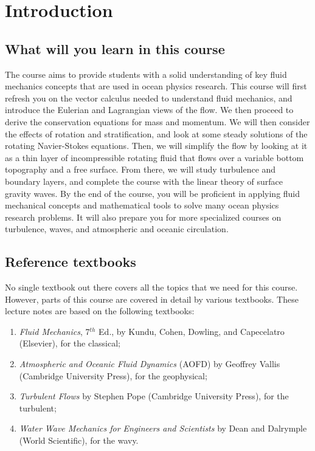 \documentclass[12pt]{article}
\numberwithin{equation}{section}
\numberwithin{figure}{section}
\numberwithin{table}{section}
\begin{document}
\newpage
\section{Introduction}

\subsection{What will you learn in this course}

The course aims to provide students with a solid understanding of key fluid
mechanics concepts that are used in ocean physics research.
This course will first refresh you on the vector calculus needed to understand
fluid mechanics, and introduce the Eulerian and Lagrangian views of the flow.
We then proceed to derive the conservation equations for mass and momentum.
We will then consider the effects of rotation and stratification, and look
at some steady solutions of the rotating Navier-Stokes equations.
Then, we will simplify the flow by looking at it as a thin layer of
incompressible rotating fluid that flows over a variable bottom topography
and a free surface.
From there, we will study turbulence and boundary layers, and complete the
course with the linear theory of surface gravity waves.
By the end of the course, you will be proficient in applying fluid mechanical
concepts and mathematical tools to solve many ocean physics research problems.
It will also prepare you for more specialized courses on turbulence, waves,
and atmospheric and oceanic circulation.

\subsection{Reference textbooks}

No single textbook out there covers all the topics that we need for this course.
However, parts of this course are covered in detail by various textbooks.
These lecture notes are based on the following textbooks:

\begin{enumerate}
  \item \textit{Fluid Mechanics}, 7$^{th}$ Ed., by Kundu, Cohen, Dowling, and Capecelatro (Elsevier), for the classical;
  \item \textit{Atmospheric and Oceanic Fluid Dynamics} (AOFD) by Geoffrey Vallis (Cambridge University Press), for the geophysical;
  \item \textit{Turbulent Flows} by Stephen Pope (Cambridge University Press), for the turbulent;
  \item \textit{Water Wave Mechanics for Engineers and Scientists} by Dean and Dalrymple (World Scientific), for the wavy.
\end{enumerate}
\end{document}
